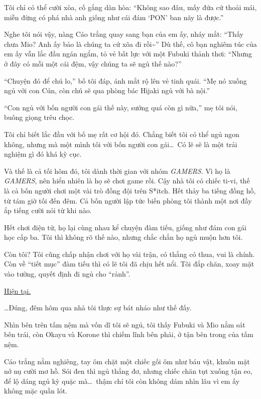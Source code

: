 \documentclass[../main.tex]{subfiles}
\begin{document}
Tôi chỉ có thể cười xòa, cố gắng dàn hòa: ``Không sao đâu, mấy đứa cứ thoải mái, miễn đừng có phá nhà anh giống như cái đám `PON' ban nãy là được.''

Nghe tôi nói vậy, nàng Cáo trắng quay sang bạn của em ấy, nháy mắt: ``Thấy chưa Mio? Anh ấy bảo là chúng ta cứ xõa đi rồi\~{}'' Dù thế, cô bạn nghiêm túc của em ấy vẫn lắc đầu ngán ngẩm, tỏ vẻ bất lực với một Fubuki thảnh thơi: ``Nhưng ở đây có mỗi một cái đệm, vậy chúng ta sẽ ngủ thế nào?''

``Chuyện đó để chú lo,'' bố tôi đáp, ánh mắt rộ lên vẻ tinh quái. ``Mẹ nó xuống ngủ với con Cún, còn chú sẽ qua phòng bác Hijaki ngủ với bà nội.''

``Con ngủ với bốn người con gái thế này, sướng quá còn gì nữa,'' mẹ tôi nói, buông giọng trêu chọc.

Tôi chỉ biết lắc đầu với bố mẹ rất cơ hội đó. Chẳng biết tôi có thể ngủ ngon không, nhưng mà một mình tôi với bốn người con gái\dots\ Có lẽ sẽ là một trải nghiệm gì đó khá kỳ cục.

Và thế là cả tối hôm đó, tôi dành thời gian với nhóm \textit{GAMERS}. Vì họ là \textit{GAMERS}, nên hiển nhiên là họ sẽ chơi game rồi. Cậy nhà tôi có chiếc ti-vi, thế là cả bốn người chơi một vài trò đồng đội trên S*itch. Hết thảy ba tiếng đồng hồ, từ tám giờ tối đến đêm. Cả bốn người lập tức biến phòng tôi thành một nơi đầy ắp tiếng cười nói từ khi nào.

Hết chơi điện tử, họ lại cùng nhau kể chuyện đàm tiếu, giống như đám con gái học cấp ba. Tôi thì không rõ thế nào, nhưng chắc chắn họ ngủ muộn hơn tôi.

Còn tôi? Tôi cũng chấp nhận chơi với họ vài trận, có thắng có thua, vui là chính. Còn về ``tiết mục'' đàm tiếu thì có lẽ tôi đã chịu hết nổi. Tôi đắp chăn, xoay mặt vào tường, quyết định đi ngủ cho ``rảnh''.

\begin{center}
    \uline{Hiện tại.}
\end{center}

\dots Đúng, đêm hôm qua nhà tôi thực sự bát nháo như thế đấy.

Nhìn bên trên tấm nệm mà vốn dĩ tôi sẽ ngủ, tôi thấy Fubuki và Mio nằm sát bên trái, còn Okayu và Korone thì chiếm lĩnh bên phải, ở tận bên trong của tấm nệm.

Cáo trắng nằm nghiêng, tay ôm chặt một chiếc gối ôm như báu vật, khuôn mặt nở nụ cười mơ hồ. Sói đen thì ngủ thẳng đơ, nhưng chiếc chăn tụt xuống tận eo, để lộ dáng ngủ kỳ quặc mà\dots\ thậm chí tôi còn không dám nhìn lâu vì em ấy không mặc quần lót.
\end{document}
